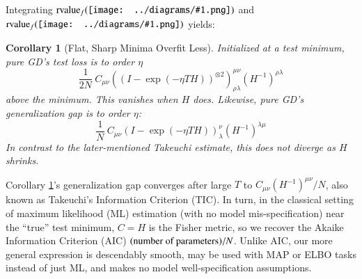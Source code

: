 \documentclass{article}
\theoremstyle{plain}
\newtheorem{cor}{Corollary}
\theoremstyle{definition}
\newcommand{\rvalue}{\text{\textnormal{rvalue}}}
\newcommand{\wrap}[1]{\left(#1\right)}
\newcommand{\sdia}[1]{\begin{gathered}\texttt{[image: ../diagrams/\#1.png]}\end{gathered}}
\begin{document}
        Integrating $\rvalue_f(\sdia{(01-2)(02-12)})$ and
        $\rvalue_f(\sdia{(01)(01)})$ yields:
        \begin{cor}[Flat, Sharp Minima Overfit Less]\label{cor:overfit}
            Initialized at a test minimum, pure GD's test loss is to
            order $\eta$
            $$
                \frac{1}{2N} ~
                    C_{\mu\nu}
                    \wrap{(I - \exp(-\eta T H))^{\otimes 2}}^{\mu\nu}_{\rho\lambda}
                    \wrap{H^{-1}}^{\rho\lambda}
            $$
            above the minimum.  This vanishes when $H$ does. 
            Likewise, pure GD's generalization gap is to order $\eta$:  
            $$
                \frac{1}{N} ~
                    C_{\mu\nu}
                    \wrap{I - \exp(-\eta T H)}^{\nu}_{\lambda}
                    \wrap{H^{-1}}^{\lambda\mu}
            $$
            In contrast to the later-mentioned Takeuchi estimate, this does not
            diverge as $H$ shrinks.
        \end{cor}
        Corollary \ref{cor:overfit}'s generalization gap converges after
        large $T$ to $C_{\mu\nu}(H^{-1})^{\mu\nu}/N$, also known as Takeuchi's
        Information Criterion (TIC).  In turn, in the classical setting of
        maximum likelihood (ML) estimation (with no model mis-specification)
        near the ``true'' test minimum, $C=H$ is the Fisher metric, so we
        recover the Akaike Information Criterion (AIC) $(\textnormal{number of
        parameters})/N$.  Unlike AIC, our more general expression is
        descendably smooth, may be used with MAP or ELBO tasks instead of just
        ML, and makes no model well-specification assumptions.
\end{document}
